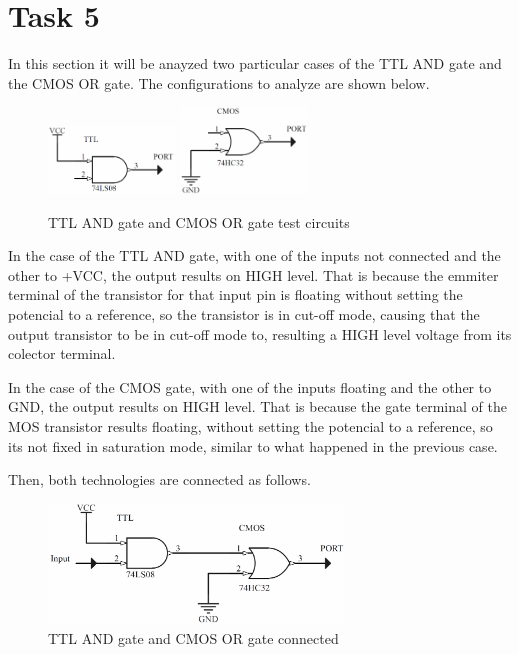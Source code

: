 \newpage 

\section*{Task 5}
In this section it will be anayzed two particular cases of the TTL AND gate and the CMOS OR gate.
The configurations to analyze are shown below.

\begin{figure}[H]
    \begin{centering}
    \includegraphics[width=0.3\textwidth]{data/TTL_EJ5}
    \includegraphics[width=0.3\textwidth]{data/CMOS_EJ5}
    \par\end{centering}
    \caption{TTL AND gate and CMOS OR gate test circuits}
\end{figure}

In the case of the TTL AND gate, with one of the inputs not connected and the other to +VCC,
 the output results on HIGH level. 
That is because the emmiter terminal of the transistor for that input pin is floating without setting 
the potencial to a reference, so the transistor is in cut-off mode, causing that the output 
transistor to be in cut-off mode to, resulting a HIGH level voltage from its colector terminal.

In the case of the CMOS gate, with one of the inputs floating and the other to GND, the output results 
on HIGH level.
That is because the gate terminal of the MOS transistor results floating, without setting the potencial
to a reference, so its not fixed in saturation mode, similar to what happened in the previous case.

Then, both technologies are connected as follows.

\begin{figure}[H]
    \begin{centering}
    \includegraphics[width=0.7\textwidth]{data/MIX_EJ5}
    \par\end{centering}
    \caption{TTL AND gate and CMOS OR gate connected}
\end{figure}

